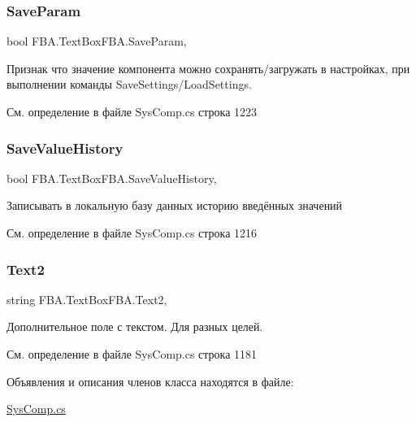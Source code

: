 \subsubsection{\texorpdfstring{Save\+Param}{SaveParam}}
{\footnotesize\ttfamily bool F\+B\+A.\+Text\+Box\+F\+B\+A.\+Save\+Param\hspace{0.3cm}{\ttfamily [get]}, {\ttfamily [set]}}



Признак что значение компонента можно сохранять/загружать в настройках, при выполнении команды Save\+Settings/\+Load\+Settings. ~\newline




См. определение в файле Sys\+Comp.\+cs строка 1223

\mbox{\label{class_f_b_a_1_1_text_box_f_b_a_aad10bd5584b4d7a24ff085ddc8d08c80}} 
\subsubsection{\texorpdfstring{Save\+Value\+History}{SaveValueHistory}}
{\footnotesize\ttfamily bool F\+B\+A.\+Text\+Box\+F\+B\+A.\+Save\+Value\+History\hspace{0.3cm}{\ttfamily [get]}, {\ttfamily [set]}}



Записывать в локальную базу данных историю введённых значений 



См. определение в файле Sys\+Comp.\+cs строка 1216

\mbox{\label{class_f_b_a_1_1_text_box_f_b_a_aba134e720b2e148d3a52951c877d8637}} 
\subsubsection{\texorpdfstring{Text2}{Text2}}
{\footnotesize\ttfamily string F\+B\+A.\+Text\+Box\+F\+B\+A.\+Text2\hspace{0.3cm}{\ttfamily [get]}, {\ttfamily [set]}}



Дополнительное поле с текстом. Для разных целей. 



См. определение в файле Sys\+Comp.\+cs строка 1181



Объявления и описания членов класса находятся в файле\+:\begin{DoxyCompactItemize}
\item 
\mbox{\hyperlink{_sys_comp_8cs}{Sys\+Comp.\+cs}}\end{DoxyCompactItemize}
